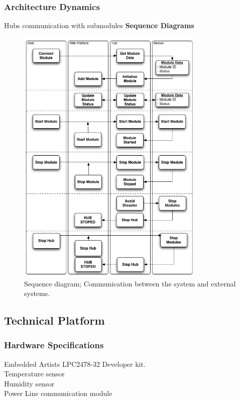 	\subsubsection{Architecture Dynamics}
		Hubs communication with submodules
		\textbf{Sequence Diagrams}
		\begin{figure}[H]		%
			\begin{centering}
				 \includegraphics[width=0.8\textwidth]{images/SequenceDiagram.png}
				\caption{Sequence diagram; Communication between the system and external systems.}
		 	\end{centering}
		\end{figure}	
\subsection{Technical Platform}

	\subsubsection{Hardware Specifications}
	Embedded Artists LPC2478-32 Developer kit.
	\\Temperature sensor
	\\Humidity sensor
	\\Power Line communication module
